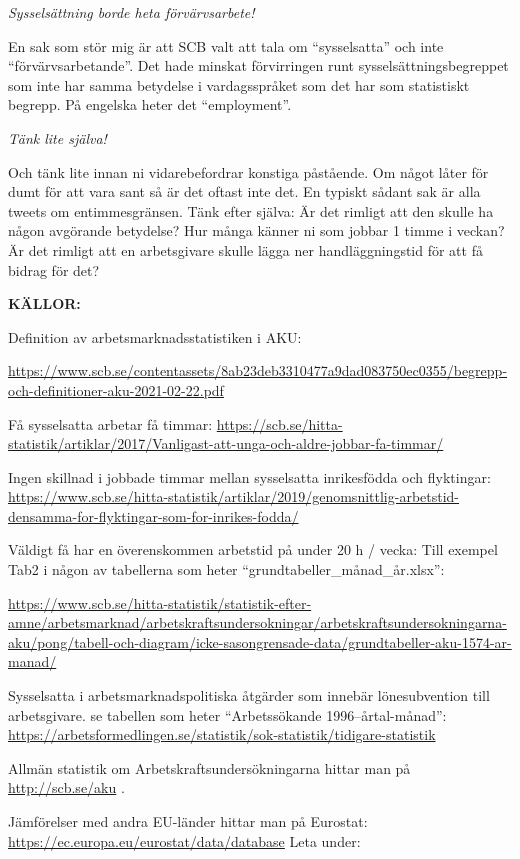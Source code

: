 \documentclass[
  letterpaper,
  DIV=11,
  numbers=noendperiod]{scrreprt}
\begin{document}
\emph{Sysselsättning borde heta förvärvsarbete!}

En sak som stör mig är att SCB valt att tala om ``sysselsatta'' och inte
``förvärvsarbetande''. Det hade minskat förvirringen runt
sysselsättningsbegreppet som inte har samma betydelse i vardagsspråket
som det har som statistiskt begrepp. På engelska heter det
``employment''.

\emph{Tänk lite själva!}

Och tänk lite innan ni vidarebefordrar konstiga påstående. Om något
låter för dumt för att vara sant så är det oftast inte det. En typiskt
sådant sak är alla tweets om entimmesgränsen. Tänk efter själva: Är det
rimligt att den skulle ha någon avgörande betydelse? Hur många känner ni
som jobbar 1 timme i veckan? Är det rimligt att en arbetsgivare skulle
lägga ner handläggningstid för att få bidrag för det?

\textbf{KÄLLOR:}

Definition av arbetsmarknadsstatistiken i AKU:

\url{https://www.scb.se/contentassets/8ab23deb3310477a9dad083750ec0355/begrepp-och-definitioner-aku-2021-02-22.pdf}

Få sysselsatta arbetar få timmar:
\url{https://scb.se/hitta-statistik/artiklar/2017/Vanligast-att-unga-och-aldre-jobbar-fa-timmar/}

Ingen skillnad i jobbade timmar mellan sysselsatta inrikesfödda och
flyktingar:
\url{https://www.scb.se/hitta-statistik/artiklar/2019/genomsnittlig-arbetstid-densamma-for-flyktingar-som-for-inrikes-fodda/}

Väldigt få har en överenskommen arbetstid på under 20 h / vecka: Till
exempel Tab2 i någon av tabellerna som heter
``grundtabeller\_månad\_år.xlsx'':

\url{https://www.scb.se/hitta-statistik/statistik-efter-amne/arbetsmarknad/arbetskraftsundersokningar/arbetskraftsundersokningarna-aku/pong/tabell-och-diagram/icke-sasongrensade-data/grundtabeller-aku-1574-ar-manad/}

Sysselsatta i arbetsmarknadspolitiska åtgärder som innebär
lönesubvention till arbetsgivare. se tabellen som heter ``Arbetssökande
1996--årtal-månad'':
\url{https://arbetsformedlingen.se/statistik/sok-statistik/tidigare-statistik}

Allmän statistik om Arbetskraftsundersökningarna hittar man på
\url{http://scb.se/aku} .

Jämförelser med andra EU-länder hittar man på Eurostat:
\url{https://ec.europa.eu/eurostat/data/database} Leta under:
\end{document}
